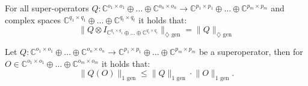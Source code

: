   \begin{corollary} \label{cor:tensor_stability}
    For all super-operators  $Q: \mathbb{C}^{o_1 \times o_1} \oplus \ldots \oplus \mathbb{C}^{o_n \times o_n}  \rightarrow \mathbb{C}^{p_1 \times p_1} \oplus \ldots \oplus  \mathbb{C}^{p_m \times p_m}$ and complex spaces $\mathbb{C}^{q_1 \times q_1} \oplus \ldots \oplus \mathbb{C}^{q_t \times q_t}$   it holds that:
  \begin{equation}
     \lVert Q \otimes I_{\mathbb{C}^{q_1 \times q_1} \oplus \ldots \oplus \mathbb{C}^{q_t \times q_t}} \rVert_{\diamondsuit \text{ gen}} = \lVert Q \rVert_{\diamondsuit \text{ gen}} 
  \end{equation}
  \end{corollary}
  
  \begin{lemma}\label{lem:q(o)}
    Let  $Q: \mathbb{C}^{o_1 \times o_1} \oplus \ldots \oplus \mathbb{C}^{o_n \times o_n}  \rightarrow \mathbb{C}^{p_1 \times p_1} \oplus \ldots \oplus  \mathbb{C}^{p_m \times p_m}$ be a superoperator, then for $O \in \mathbb{C}^{o_1 \times o_1} \oplus \ldots \oplus  \mathbb{C}^{o_m \times o_m}$ it holds that:
    \begin{equation} \label{eq:qo<q}
      \lVert Q(O) \rVert_{1 \text{ gen}} \leq \lVert Q  \rVert_{1 \text{ gen}} \cdot \lVert O  \rVert_{1 \text{ gen}}.
    \end{equation}
  \end{lemma}
  
